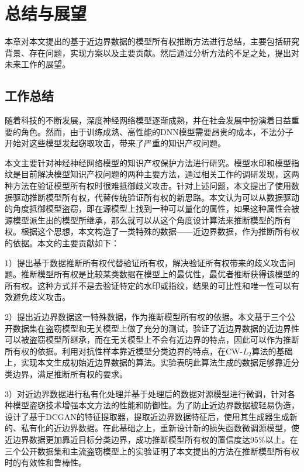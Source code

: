 \chapter{总结与展望}\label{6}

本章对本文提出的基于近边界数据的模型所有权推断方法进行总结，主要包括研究背景、存在问题，实现方案以及主要贡献。然后通过分析方法的不足之处，提出对未来工作的展望。

\section{工作总结}

随着科技的不断发展，深度神经网络模型逐渐成熟，并在社会发展中扮演着日益重要的角色。然而，由于训练成熟、高性能的DNN模型需要昂贵的成本，不法分子开始对这些模型发起窃取攻击，带来了严重的知识产权问题。

本文主要针对神经神经网络模型的知识产权保护方法进行研究。模型水印和模型指纹是目前解决模型知识产权问题的两种主要方法，通过相关工作的调研发现，这两种方法在验证模型所有权时很难抵御歧义攻击。针对上述问题，本文提出了使用数据驱动推断模型所有权，代替传统验证所有权的新思路。本文认为可以从数据驱动的角度抵御模型盗窃，即在源模型上找到一种可以量化的属性，如果这种属性会被源模型派生出的模型所继承，那么就可以从这个角度设计算法来推断模型的所有权。根据这个思想，本文构造了一类特殊的数据——近边界数据，作为推断所有权的依据。本文的主要贡献如下：

1）提出基于数据推断所有权代替验证所有权，解决验证所有权带来的歧义攻击问题。推断模型所有权是比较某类数据在模型上的最优性，最优者推断获得该模型的所有权。这种方式并不是去验证特定的水印或指纹，结果的可比性和唯一性可以有效避免歧义攻击。

2）提出近边界数据这一特殊数据，作为推断模型所有权的依据。本文基于三个公开数据集在盗窃模型和无关模型上做了充分的测试，验证了近边界数据的近边界性可以被盗窃模型所继承，而在无关模型上不会有近边界的特点，因此可以作为推断所有权的依据。利用对抗性样本靠近模型分类边界的特点，在CW-$L_2$算法的基础上，实现本文生成初始近边界数据的算法。实验表明此算法生成的数据足够靠近分类边界，满足推断所有权的要求。

3）对近边界数据进行私有化处理并基于处理后的数据对源模型进行微调，针对各种模型盗窃技术增强本文方法的性能和防御性。为了防止近边界数据被轻易伪造，设计了基于DCGAN的特征提取器，提取近边界数据特征后，使用其生成器生成新的、私有化的近边界数据。在此基础之上，重新设计新的损失函数微调源模型，使近边界数据更加靠近目标分类边界，成功推断模型所有权的置信度达95\%以上。在三个公开数据集和主流盗窃模型上的实验证明了本文提出的方法在推断模型所有权时的有效性和鲁棒性。


